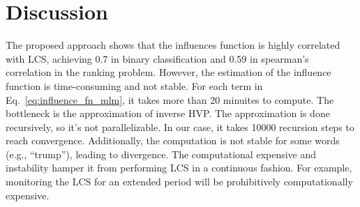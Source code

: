 \section{Discussion}

The proposed approach shows that the influences function is highly correlated with LCS, achieving 0.7 in binary classification and 0.59 in spearman's correlation in the ranking problem.
However, the estimation of the influence function is time-consuming and not stable.
For each term in Eq.~\ref{eq:influence_fn_mlm}, it takes more than 20 minuites to compute.
The bottleneck is the approximation of inverse HVP. 
The approximation is done recursively, so it's not parallelizable. In our case, it takes 10000 recursion steps to reach convergence.
Additionally, the computation is not stable for some words (e.g., ``trump''), leading to divergence.
The computational expensive and instability hamper it from performing LCS in a continuous fashion. For example, monitoring the LCS for an extended period will be prohibitively computationally expensive.

